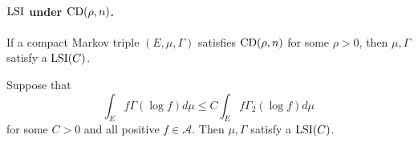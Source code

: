 \paragraph{$\operatorname{LSI}$ under $\operatorname{CD}(\rho,n)$.}

\begin{thm}\label{thm:lsi_cdn}
    If a compact Markov triple $(E,\mu,\Gamma)$ satisfies $\operatorname{CD}(\rho,n)$ for some $\rho > 0$, then $\mu,\Gamma$ satisfy a $\operatorname{LSI}(C)$.
\end{thm}
\begin{lem}
    Suppose that
    \begin{equation*}
        \int_E f \Gamma(\log f) d \mu \leq C \int_E f \Gamma_2(\log f) d \mu
    \end{equation*}
    for some $C > 0$ and all positive $f \in \mathcal{A}$. Then $\mu,\Gamma$ satisfy a $\operatorname{LSI}(C)$.
\end{lem}
